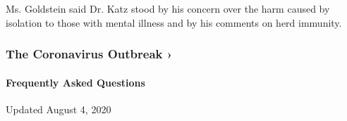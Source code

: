 Ms. Goldstein said Dr. Katz stood by his concern over the harm caused by
isolation to those with mental illness and by his comments on herd
immunity.

\href{https://www.nytimes3xbfgragh.onion/news-event/coronavirus?action=click\&pgtype=Article\&state=default\&region=MAIN_CONTENT_3\&context=storylines_faq}{}

\hypertarget{the-coronavirus-outbreak-}{%
\subsubsection{The Coronavirus Outbreak
›}\label{the-coronavirus-outbreak-}}

\hypertarget{frequently-asked-questions}{%
\paragraph{Frequently Asked
Questions}\label{frequently-asked-questions}}

Updated August 4, 2020

